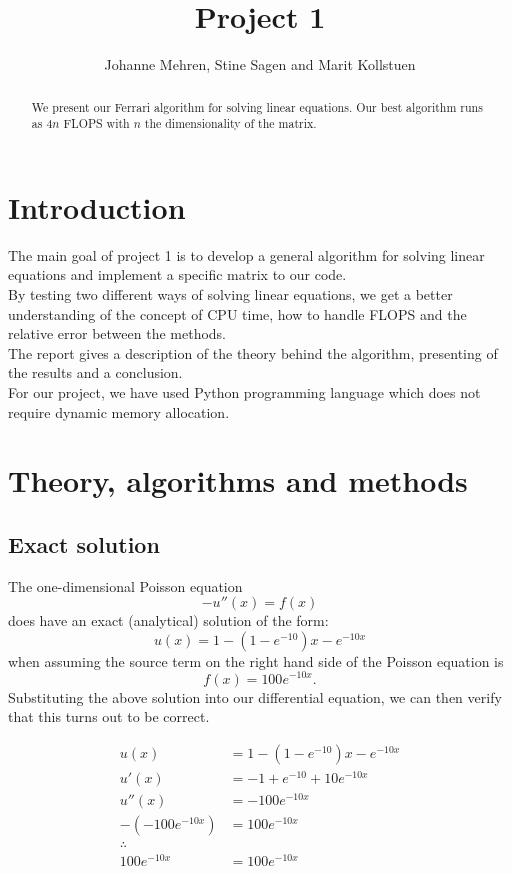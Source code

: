 \documentclass{article}
\title{Project 1}
\author{Johanne Mehren, Stine Sagen and Marit Kollstuen}
\begin{document}
\begin{abstract}
We present our Ferrari algorithm for solving linear equations. Our best algorithm runs as $4n$ FLOPS with $n$ the dimensionality of the matrix.
\end{abstract}


\maketitle

\section{Introduction}
The main goal of project 1 is to develop a general algorithm for solving linear equations and implement a specific matrix to our code. \\
By testing two different ways of solving linear equations, we get a better understanding of the concept of CPU time, how to handle FLOPS and the relative error between the methods.  \\
The report gives a description of the theory behind the algorithm, presenting of the results and a conclusion. \\
For our project, we have used Python programming language which does not require dynamic memory allocation. 

\section{Theory, algorithms and methods}
\subsection{Exact solution}
The one-dimensional Poisson equation \begin{equation} -u''(x) = f(x) \end{equation} does have an exact (analytical) solution of the form: \begin{equation} u(x) = 1 - (1-e^{-10})x - e^{-10x} \end{equation} when assuming the source term on the right hand side of the Poisson equation is \begin{equation} f(x) = 100e^{-10x}. \end{equation} Substituting the above solution into our differential equation, we can then verify that this turns out to be correct. 

\begin{align*}
u(x)& = 1 - (1-e^{-10})x - e^{-10x}  \\
u'(x)& = -1 + e^{-10} + 10e^{-10x} \\
u''(x)& = -100e^{-10x}  \\
-(-100e^{-10x})& = 100e^{-10x} \\
\therefore \\
100e^{-10x}& = 100e^{-10x}
\end{align*}
\end{document}
